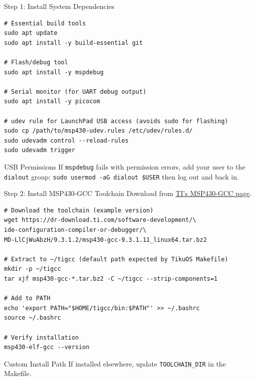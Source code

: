 \documentclass[aspectratio=169, 10pt]{beamer}
\begin{document}
\begin{frame}[fragile]{Step 1: Install System Dependencies}
\begin{lstlisting}[style=bashstyle]
# Essential build tools
sudo apt update
sudo apt install -y build-essential git

# Flash/debug tool
sudo apt install -y mspdebug

# Serial monitor (for UART debug output)
sudo apt install -y picocom

# udev rule for LaunchPad USB access (avoids sudo for flashing)
sudo cp /path/to/msp430-udev.rules /etc/udev/rules.d/
sudo udevadm control --reload-rules
sudo udevadm trigger
\end{lstlisting}

\begin{alertblock}{USB Permissions}
If \texttt{mspdebug} fails with permission errors, add your user to the
\texttt{dialout} group: \texttt{sudo usermod -aG dialout \$USER}
then log out and back in.
\end{alertblock}
\end{frame}

\begin{frame}[fragile]{Step 2: Install MSP430-GCC Toolchain}
Download from \href{https://www.ti.com/tool/MSP430-GCC-OPENSOURCE}{TI's MSP430-GCC page}.

\begin{lstlisting}[style=bashstyle]
# Download the toolchain (example version)
wget https://dr-download.ti.com/software-development/\
ide-configuration-compiler-or-debugger/\
MD-LlCjWuAbzH/9.3.1.2/msp430-gcc-9.3.1.11_linux64.tar.bz2

# Extract to ~/tigcc (default path expected by TikuOS Makefile)
mkdir -p ~/tigcc
tar xjf msp430-gcc-*.tar.bz2 -C ~/tigcc --strip-components=1

# Add to PATH
echo 'export PATH="$HOME/tigcc/bin:$PATH"' >> ~/.bashrc
source ~/.bashrc

# Verify installation
msp430-elf-gcc --version
\end{lstlisting}

\begin{block}{Custom Install Path}
If installed elsewhere, update \texttt{TOOLCHAIN\_DIR} in the Makefile.
\end{block}
\end{frame}
\end{document}
